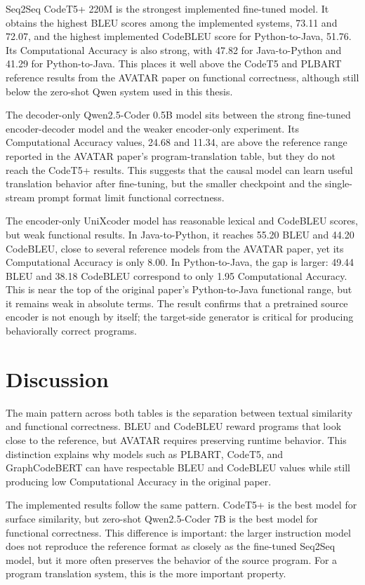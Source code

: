 Seq2Seq CodeT5+ 220M is the strongest implemented fine-tuned model. It obtains
the highest BLEU scores among the implemented systems, 73.11 and 72.07, and the
highest implemented CodeBLEU score for Python-to-Java, 51.76. Its
Computational Accuracy is also strong, with 47.82 for Java-to-Python and 41.29
for Python-to-Java. This places it well above the CodeT5 and PLBART reference
results from the AVATAR paper on functional correctness, although still below
the zero-shot Qwen system used in this thesis.

The decoder-only Qwen2.5-Coder 0.5B model sits between the strong fine-tuned
encoder-decoder model and the weaker encoder-only experiment. Its
Computational Accuracy values, 24.68 and 11.34, are above the reference range
reported in the AVATAR paper's program-translation table, but they do not reach
the CodeT5+ results. This suggests that the causal model can learn useful
translation behavior after fine-tuning, but the smaller checkpoint and the
single-stream prompt format limit functional correctness.

The encoder-only UniXcoder model has reasonable lexical and CodeBLEU scores,
but weak functional results. In Java-to-Python, it reaches 55.20 BLEU and 44.20
CodeBLEU, close to several reference models from the AVATAR paper, yet its
Computational Accuracy is only 8.00. In Python-to-Java, the gap is larger:
49.44 BLEU and 38.18 CodeBLEU correspond to only 1.95 Computational Accuracy.
This is near the top of the original paper's Python-to-Java functional range,
but it remains weak in absolute terms. The result confirms that a pretrained
source encoder is not enough by itself; the target-side generator is critical
for producing behaviorally correct programs.

\section{Discussion}

\quad The main pattern across both tables is the separation between textual
similarity and functional correctness. BLEU and CodeBLEU reward programs that
look close to the reference, but AVATAR requires preserving runtime behavior.
This distinction explains why models such as PLBART, CodeT5, and
GraphCodeBERT can have respectable BLEU and CodeBLEU values while still
producing low Computational Accuracy in the original paper.

The implemented results follow the same pattern. CodeT5+ is the best model for
surface similarity, but zero-shot Qwen2.5-Coder 7B is the best model for
functional correctness. This difference is important: the larger instruction
model does not reproduce the reference format as closely as the fine-tuned
Seq2Seq model, but it more often preserves the behavior of the source program.
For a program translation system, this is the more important property.

